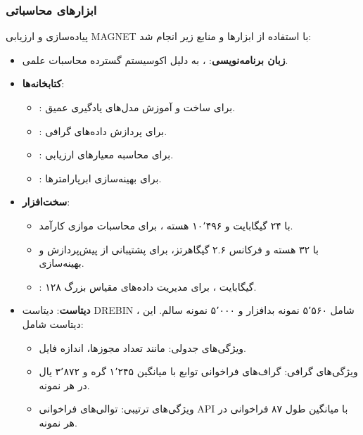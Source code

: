 \subsubsection{ابزارهای محاسباتی}
پیاده‌سازی و ارزیابی MAGNET با استفاده از ابزارها و منابع زیر انجام شد:
\begin{itemize}
    \item \textbf{زبان برنامه‌نویسی}: ، به دلیل اکوسیستم گسترده محاسبات علمی.
    \item \textbf{کتابخانه‌ها}:
        \begin{itemize}
            \item {}: برای ساخت و آموزش مدل‌های یادگیری عمیق.
            \item {}: برای پردازش داده‌های گرافی.
            \item {}: برای محاسبه معیارهای ارزیابی.
            \item {}: برای بهینه‌سازی ابرپارامترها.
        \end{itemize}
    \item \textbf{سخت‌افزار}:
        \begin{itemize}
            \item {} با ۲۴ گیگابایت  و ۱۰٬۴۹۶ هسته ، برای محاسبات موازی کارآمد.
            \item {} با ۳۲ هسته و فرکانس ۲.۶ گیگاهرتز، برای پشتیبانی از پیش‌پردازش و بهینه‌سازی.
            \item {}: ۱۲۸ گیگابایت ، برای مدیریت داده‌های مقیاس بزرگ.
        \end{itemize}
    \item \textbf{دیتاست}: دیتاست DREBIN \cite{Drebin}، شامل ۵٬۵۶۰ نمونه بدافزار و ۵٬۰۰۰ نمونه سالم. این دیتاست شامل:
        \begin{itemize}
            \item ویژگی‌های جدولی: مانند تعداد مجوزها، اندازه فایل.
            \item ویژگی‌های گرافی: گراف‌های فراخوانی توابع با میانگین ۱٬۲۴۵ گره و ۳٬۸۷۲ یال در هر نمونه.
            \item ویژگی‌های ترتیبی: توالی‌های فراخوانی API با میانگین طول ۸۷ فراخوانی در هر نمونه.
        \end{itemize}
\end{itemize}

